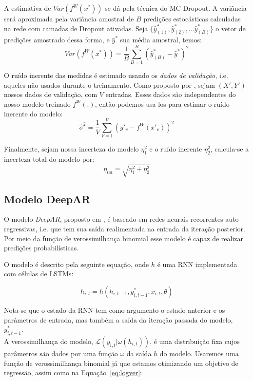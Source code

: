 A estimativa de $Var(f^W(x^*))$ se dá pela técnica do MC Dropout. A variância
será aproximada pela variância amostral de $B$ predições estocásticas calculadas
na rede com camadas de Dropout ativadas. Seja $\{\hat{y}^*_{(1)},\hat{y}^*_{(2)}, \dots
\hat{y}^*_{(B)}\}$ o vetor de predições amostrado dessa forma, e $\hat{y}^*$ sua
média amostral, temos: \\

\[   Var(f^W(x^*))  = \frac{1}{B}\sum^B_{B=1}(\hat{y}^*_{(B)} - \hat{y}^*)^2  \]


O ruído inerente das medidas é estimado usando os \textit{dados de validação},
i.e. aqueles não
usados durante o treinamento. Como
proposto por \citep{ubertime}, sejam $(X',Y')$ nossos dados de validação, com
$V$ entradas. Esses dados são independentes do nosso modelo
treinado $f^W(.)$, então podemos usa-los para estimar o ruído inerente do
modelo: \\

\[ \hat{\sigma}^2 = \frac{1}{V}\sum^V_{V=1}(y'_v - f^W(x'_v))^2 \]

Finalmente, sejam nossa incerteza do modelo $\eta_1^2$ e o ruído inerente
$\eta^2_2$, calcula-se a incerteza total do modelo por: \\

\[  \eta_{tot} = \sqrt{  \eta_1^2 + \eta_2^2 }  \]


\subsection{Modelo DeepAR}

O modelo \textit{DeepAR}, proposto em \citep{deepar}, é baseado em redes neurais recorrentes auto-regressivas,
i.e. que tem sua saída realimentada na entrada da iteração posterior. Por meio da função de verossimilhança binomial esse modelo é capaz
de realizar predições probabilísticas.

O modelo é descrito pela seguinte equação, onde $h$ é uma RNN implementada com células de LSTMs:

\[
h_{i,t} = h(h_{i,t-1},y^*_{i,t-1},x_{i,t}, \theta)
\]

Nota-se que o estado da RNN tem como argumento o estado anterior e os parâmetros de entrada, mas também a saída da iteração passada do modelo, $y^*_{i,t-1}$. \\

A verossimilhança do modelo, $\mathcal{L}(y_{i,t} | \omega(h_{i,t}))$, é uma distribuição fixa cujos parâmetros são dados por uma função $\omega$ da saída $h$ do modelo. Usaremos uma função de verossimilhança binomial já que estamos otimizando um objetivo de regressão, assim como na Equação~\ref{eq:logver}:


